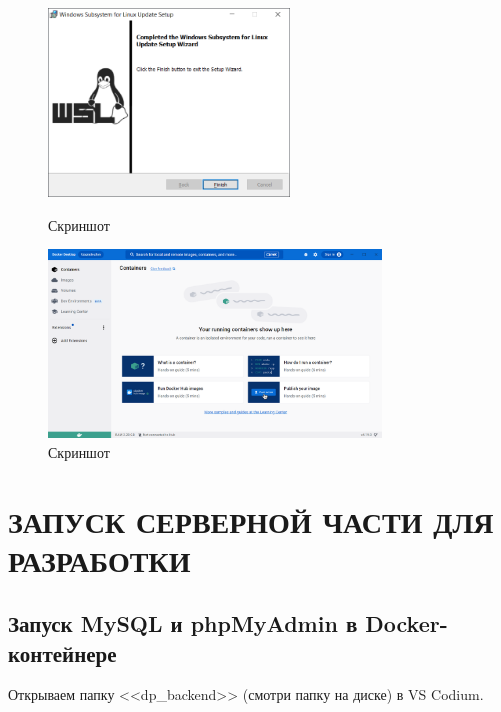 \begin{figure}[!phtb]
    \centering

    \begin{minipage}{0.49\textwidth}
        \centering

        \includegraphics[height=5cm]
        {images/install/docker/9.png}

        \caption{Скриншот}

        \label{fig:docker_9}
    \end{minipage}
    \begin{minipage}{0.49\textwidth}
        \centering

        \includegraphics[height=5cm]
        {images/install/docker/10.png}

        \caption{Скриншот}

        \label{fig:docker_10}
    \end{minipage}
\end{figure}

\section{ЗАПУСК СЕРВЕРНОЙ ЧАСТИ ДЛЯ РАЗРАБОТКИ}

\subsection{Запуск MySQL и phpMyAdmin в Docker-контейнере}

Открываем папку <<dp\_backend>> (смотри папку на диске) в VS Codium.

